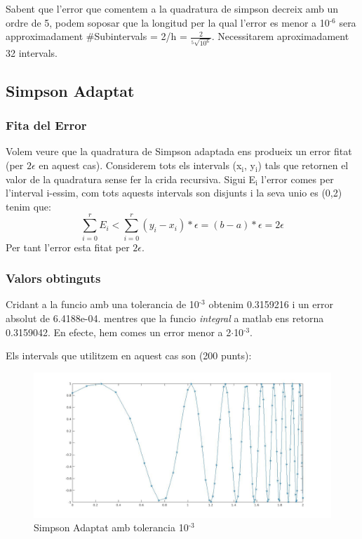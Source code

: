 \documentclass[11pt]{article}
\begin{document}
Sabent que l'error que comentem a la quadratura de simpson decreix amb un ordre de 5, podem soposar que la longitud per la qual l'error es menor a 10\(^{\text{-6}}\) sera approximadament \#Subintervals = 2/h = \(\frac{2}{^5\sqrt{10^6}}\). Necessitarem aproximadament 32 intervals.
\subsection{Simpson Adaptat}
\label{sec:org43aab63}
\subsubsection{Fita del Error}
\label{sec:org43e0ccb}
Volem veure que la quadratura de Simpson adaptada ens produeix un error fitat (per \(2\epsilon\) en aquest cas). Considerem tots els intervals (x\(_{\text{i}}\), y\(_{\text{i}}\)) tals que retornen el valor de la quadratura sense fer la crida recursiva. Sigui E\(_{\text{i}}\) l'error comes per l'interval i-essim, com tots aquests intervals son disjunts i la seva unio es (0,2) tenim que:
\[ \sum_{i=0}^{r} E_{i} < \sum_{i=0}^{r} (y_i - x_i)*\epsilon = (b-a)*\epsilon = 2\epsilon \]
Per tant l'error esta fitat per \(2\epsilon.\)
\subsubsection{Valors obtinguts}
\label{sec:org0c9c664}
Cridant a la funcio amb una tolerancia de 10\(^{\text{-3}}\) obtenim 0.3159216 i un error absolut de 6.4188e-04. mentres que la funcio \emph{integral} a matlab ens retorna 0.3159042. En efecte, hem comes un error menor a 2\(\cdot\)10\(^{\text{-3}}\).

Els intervals que utilitzem en aquest cas son (200 punts):

\begin{figure}[htbp]
\centering
\includegraphics[width=.9\linewidth]{./SimpsonAdaptat.jpg}
\caption{\label{fig:orga5ffe4e}
Simpson Adaptat amb tolerancia 10\(^{\text{-3}}\)}
\end{figure}
\end{document}
